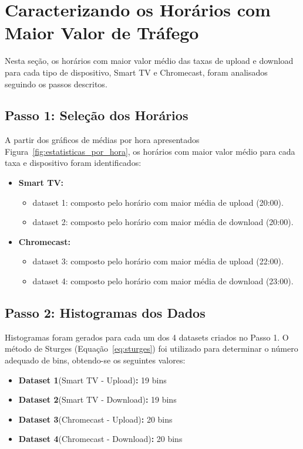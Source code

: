 \section{Caracterizando os Horários com Maior Valor de Tráfego}

Nesta seção, os horários com maior valor médio das taxas de upload e download para cada tipo de dispositivo, Smart TV e Chromecast, foram analisados seguindo os passos descritos.

\subsection{Passo 1: Seleção dos Horários}

A partir dos gráficos de médias por hora apresentados Figura~\ref{fig:estatisticas_por_hora}, os horários com maior valor médio para cada taxa e dispositivo foram identificados:
\begin{itemize}
    \item \textbf{Smart TV:}
        \begin{itemize}
            \item dataset 1: composto pelo horário com maior média de upload (20:00).
            \item dataset 2: composto pelo horário com maior média de download (20:00).
        \end{itemize}
    \item \textbf{Chromecast:}
        \begin{itemize}
            \item dataset 3: composto pelo horário com maior média de upload (22:00).
            \item dataset 4: composto pelo horário com maior média de download (23:00).
        \end{itemize}
\end{itemize}

\subsection{Passo 2: Histogramas dos Dados}

Histogramas foram gerados para cada um dos 4 datasets criados no Passo 1. O método de Sturges (Equação~\ref{eq:sturges}) foi utilizado para determinar o número adequado de bins, obtendo-se os seguintes valores:

\begin{itemize}
    \item \textbf{Dataset 1}(Smart TV - Upload)\textbf{:}  19 bins
    \item \textbf{Dataset 2}(Smart TV - Download)\textbf{:}  19 bins
    \item \textbf{Dataset 3}(Chromecast - Upload)\textbf{:}  20 bins
    \item \textbf{Dataset 4}(Chromecast - Download)\textbf{:}  20 bins
\end{itemize}

